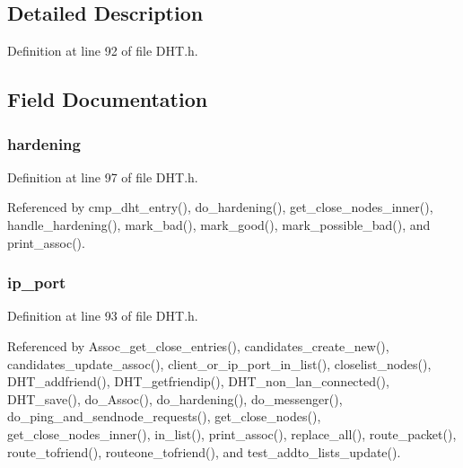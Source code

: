 \subsection{Detailed Description}


Definition at line 92 of file D\+H\+T.\+h.



\subsection{Field Documentation}
\hypertarget{struct_i_p_p_ts_png_a247a5bc6669d45b7241b58223ce8fd1d}{
\subsubsection[{hardening}]{ hardening}}\label{struct_i_p_p_ts_png_a247a5bc6669d45b7241b58223ce8fd1d}


Definition at line 97 of file D\+H\+T.\+h.



Referenced by cmp\+\_\+dht\+\_\+entry(), do\+\_\+hardening(), get\+\_\+close\+\_\+nodes\+\_\+inner(), handle\+\_\+hardening(), mark\+\_\+bad(), mark\+\_\+good(), mark\+\_\+possible\+\_\+bad(), and print\+\_\+assoc().

\hypertarget{struct_i_p_p_ts_png_a86e2a5a56c0dd22df6e8b8a10e40f9e4}{
\subsubsection[{ip\+\_\+port}]{ ip\+\_\+port}}\label{struct_i_p_p_ts_png_a86e2a5a56c0dd22df6e8b8a10e40f9e4}


Definition at line 93 of file D\+H\+T.\+h.



Referenced by Assoc\+\_\+get\+\_\+close\+\_\+entries(), candidates\+\_\+create\+\_\+new(), candidates\+\_\+update\+\_\+assoc(), client\+\_\+or\+\_\+ip\+\_\+port\+\_\+in\+\_\+list(), closelist\+\_\+nodes(), D\+H\+T\+\_\+addfriend(), D\+H\+T\+\_\+getfriendip(), D\+H\+T\+\_\+non\+\_\+lan\+\_\+connected(), D\+H\+T\+\_\+save(), do\+\_\+\+Assoc(), do\+\_\+hardening(), do\+\_\+messenger(), do\+\_\+ping\+\_\+and\+\_\+sendnode\+\_\+requests(), get\+\_\+close\+\_\+nodes(), get\+\_\+close\+\_\+nodes\+\_\+inner(), in\+\_\+list(), print\+\_\+assoc(), replace\+\_\+all(), route\+\_\+packet(), route\+\_\+tofriend(), routeone\+\_\+tofriend(), and test\+\_\+addto\+\_\+lists\+\_\+update().

